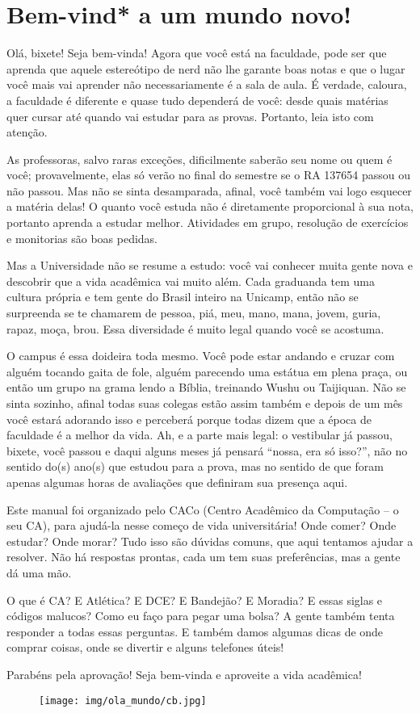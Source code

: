 
\section{Bem-vind* a um mundo novo!}

Olá, bixete! Seja bem-vinda! Agora que você está na faculdade, pode ser que
aprenda que aquele estereótipo de nerd não lhe garante boas notas e que o lugar
você mais vai aprender não necessariamente é a sala de aula. É verdade,
caloura, a faculdade é diferente e quase tudo dependerá de você: desde quais
matérias quer cursar até quando vai estudar para as provas. Portanto, leia isto
com atenção.

As professoras, salvo raras exceções, dificilmente saberão seu nome ou quem é
você; provavelmente, elas só verão no final do semestre se o RA 137654 passou
ou não passou. Mas não se sinta desamparada, afinal, você também vai logo
esquecer a matéria delas! O quanto você estuda não é diretamente proporcional à
sua nota, portanto aprenda a estudar melhor. Atividades em grupo, resolução de
exercícios e monitorias são boas pedidas.

Mas a Universidade não se resume a estudo: você vai conhecer muita gente nova e
descobrir que a vida acadêmica vai muito além.  Cada graduanda tem uma cultura
própria e tem gente do Brasil inteiro na Unicamp, então não se surpreenda se te
chamarem de pessoa, piá, meu, mano, mana, jovem, guria, rapaz, moça, brou.
Essa diversidade é muito legal quando você se acostuma.

O campus é essa doideira toda mesmo. Você pode estar andando e cruzar com
alguém tocando gaita de fole, alguém parecendo uma estátua em plena praça, ou
então um grupo na grama lendo a Bíblia, treinando Wushu ou Taijiquan. Não se
sinta sozinho, afinal todas suas colegas estão assim também e depois de um mês
você estará adorando isso e perceberá porque todas dizem que a época de
faculdade é a melhor da vida. Ah, e a parte mais legal: o vestibular já passou,
bixete, você passou e daqui alguns meses já pensará ``nossa, era só isso?'',
não no sentido do(s) ano(s) que estudou para a prova, mas no sentido de que
foram apenas algumas horas de avaliações que definiram sua presença aqui.

Este manual foi organizado pelo CACo (Centro Acadêmico da Computação -- o seu
CA), para ajudá-la nesse começo de vida universitária! Onde comer? Onde
estudar? Onde morar? Tudo isso são dúvidas comuns, que aqui tentamos ajudar a
resolver. Não há respostas prontas, cada um tem suas preferências, mas a gente
dá uma mão.

O que é CA? E Atlética? E DCE? E Bandejão? E Moradia? E essas siglas e códigos
malucos? Como eu faço para pegar uma bolsa? A gente também tenta responder a
todas essas perguntas. E também damos algumas dicas de onde comprar coisas,
onde se divertir e alguns telefones úteis!

Parabéns pela aprovação! Seja bem-vinda e aproveite a vida acadêmica!

\begin{figure}[t]
    \texttt{[image: img/ola\_mundo/cb.jpg]}
\end{figure}
